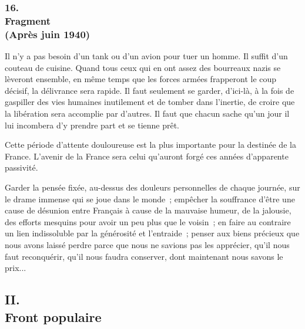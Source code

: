 \documentclass[french,twoside]{book} %
\begin{document}
\subsubsection[{16. Fragment, (Après juin 1940)}]{16. \\
Fragment \\
(Après juin 1940)}
\noindent \par
Il n'y a pas besoin d'un tank ou d'un avion pour tuer un homme. Il suffit d'un couteau de cuisine. Quand tous ceux qui en ont assez des bourreaux nazis se lèveront ensemble, en même temps que les forces armées frapperont le coup décisif, la délivrance sera rapide. Il faut seulement se garder, d'ici-là, à la fois de gaspiller des vies humaines inutilement et de tomber dans l'inertie, de croire que la libération sera accomplie par d'autres. Il faut que chacun sache qu'un jour il lui incombera d'y prendre part et se tienne prêt.\par
Cette période d'attente douloureuse est la plus importante pour la destinée de la France. L'avenir de la France sera celui qu'auront forgé ces années d'apparente passivité.\par
Garder la pensée fixée, au-dessus des douleurs personnelles de chaque journée, sur le drame immense qui se joue dans le monde ; empêcher la souffrance d'être une cause de désunion entre Français à cause de la mauvaise humeur, de la jalousie, des efforts mesquins pour avoir un peu plus que le voisin ; en faire au contraire un lien indissoluble par la générosité et l'entraide ; penser aux biens précieux que nous avons laissé perdre parce que nous ne savions pas les apprécier, qu'il nous faut reconquérir, qu'il nous faudra conserver, dont maintenant nous savons le prix...\par

\begin{center}
\noindent \centerline{}
\end{center}

\subsection[{II. Front populaire}]{II. \\
Front populaire}
\end{document}
